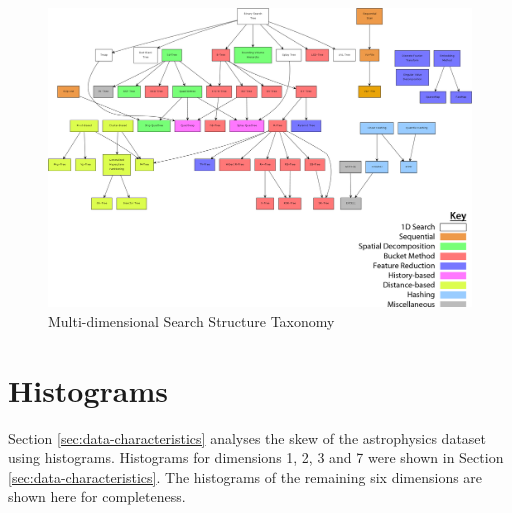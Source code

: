 \begin{landscape}
	\null  %
	\nointerlineskip  %
	\vfill
	\let\snewpage \newpage
	\let\newpage \relax
		\begin{figure}[H]
			\centering
			\includegraphics[scale=0.35]{figures/md_structure_taxonomy.png}
			\caption{Multi-dimensional Search Structure Taxonomy}
			\label{fig:structure-taxonomy}
		\end{figure}
	\let \newpage \snewpage
	\vfill 
	\break %

	\newpage

\end{landscape}

\section{Histograms}
\label{sec:app-histograms}

Section \ref{sec:data-characteristics} analyses the skew of the astrophysics dataset using histograms. Histograms for dimensions 1, 2, 3 and 7 were shown in Section \ref{sec:data-characteristics}. The histograms of the remaining six dimensions are shown here for completeness.

